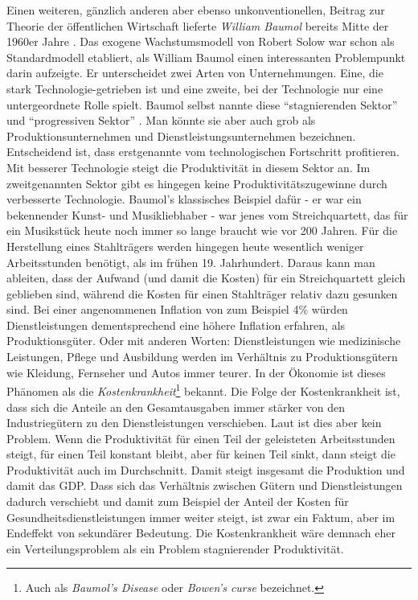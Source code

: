 Einen weiteren, gänzlich anderen aber ebenso unkonventionellen, Beitrag zur Theorie der öffentlichen Wirtschaft lieferte \textit{William Baumol} bereits Mitte der 1960er Jahre \parencite{Baumol1965, Baumol1967}. Das exogene Wachstumsmodell von Robert Solow war schon als Standardmodell etabliert, als William Baumol einen interessanten Problempunkt darin aufzeigte. Er unterscheidet zwei Arten von Unternehmungen. Eine, die stark Technologie-getrieben ist und eine zweite, bei der Technologie nur eine untergeordnete Rolle spielt. Baumol selbst nannte diese "`stagnierenden Sektor"' und "`progressiven Sektor"' \parencite[S. XX]{Baumol2012}. Man könnte sie aber auch grob als Produktionsunternehmen und Dienstleistungsunternehmen bezeichnen. Entscheidend ist, dass erstgenannte vom technologischen Fortschritt profitieren. Mit besserer Technologie steigt die Produktivität in diesem Sektor an. Im zweitgenannten Sektor gibt es hingegen keine Produktivitätszugewinne durch verbesserte Technologie. Baumol's klassisches Beispiel dafür - er war ein bekennender Kunst- und Musikliebhaber \parencite[S. 228]{Krueger2001Interview} - war jenes vom Streichquartett, das für ein Musikstück heute noch immer so lange braucht wie vor 200 Jahren. Für die Herstellung eines Stahlträgers werden hingegen heute wesentlich weniger Arbeitsstunden benötigt, als im frühen 19. Jahrhundert. Daraus kann man ableiten, dass der Aufwand (und damit die Kosten) für ein Streichquartett gleich geblieben sind, während die Kosten für einen Stahlträger relativ dazu gesunken sind. Bei einer angenommenen Inflation von zum Beispiel 4\% würden Dienstleistungen dementsprechend eine höhere Inflation erfahren, als Produktionsgüter. Oder mit anderen Worten: Dienstleistungen wie medizinische Leistungen, Pflege und Ausbildung werden im Verhältnis zu Produktionsgütern wie Kleidung, Fernseher und Autos immer teurer. In der Ökonomie ist dieses Phänomen als die \textit{Kostenkrankheit}\footnote{Auch als \textit{Baumol's Disease} oder \textit{Bowen's curse} bezeichnet\parencite[S. 3]{Baumol2012}.} bekannt.
Die Folge der Kostenkrankheit ist, dass sich die Anteile an den Gesamtausgaben immer stärker von den Industriegütern zu den Dienstleistungen verschieben. Laut \textcite[S. 43]{Baumol2012} ist dies aber kein Problem. Wenn die Produktivität für einen Teil der geleisteten Arbeitsstunden steigt, für einen Teil konstant bleibt, aber für keinen Teil sinkt, dann steigt die Produktivität auch im Durchschnitt. Damit steigt insgesamt die Produktion und damit das GDP. Dass sich das Verhältnis zwischen Gütern und Dienstleistungen dadurch verschiebt und damit zum Beispiel der Anteil der Kosten für Gesundheitsdienstleistungen immer weiter steigt, ist zwar ein Faktum, aber im Endeffekt von sekundärer Bedeutung. Die Kostenkrankheit wäre demnach eher ein Verteilungsproblem als ein Problem stagnierender Produktivität. 

